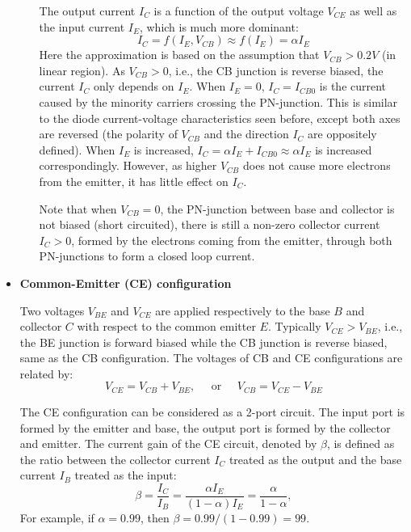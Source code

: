 \documentclass{article}
\begin{document}
\begin{itemize}
\begin{itemize}
    The output current $I_C$ is a function of the output voltage $V_{CE}$
    as well as the input current $I_E$, which is much more dominant:
    \begin{equation} 
    I_C=f(I_E,V_{CB})\approx f(I_E)=\alpha I_E
    \end{equation}
    Here the approximation is based on the assumption that $V_{CB}>0.2V$
    (in linear region). As $V_{CB}>0$, i.e., the CB junction is reverse 
    biased, the current $I_C$ only depends on $I_E$. When $I_E=0$, 
    $I_C=I_{CB0}$ is the current caused by the minority carriers crossing 
    the PN-junction. This is similar to the diode current-voltage 
    characteristics seen before, except both axes are reversed (the 
    polarity of $V_{CB}$ and the direction $I_C$ are oppositely defined).
    When $I_E$ is increased, $I_C=\alpha I_E+I_{CB0}\approx \alpha I_E$ is 
    increased correspondingly. However, as higher $V_{CB}$ does not cause
    more electrons from the emitter, it has little effect on $I_C$.

    Note that when $V_{CB}=0$, the PN-junction between base and collector
    is not biased (short circuited), there is still a non-zero collector 
    current $I_C>0$, formed by the electrons coming from the emitter,
    through both PN-junctions to form a closed loop current.
    

  \end{itemize}

\item {\bf Common-Emitter (CE) configuration}

  Two voltages $V_{BE}$ and $V_{CE}$ are applied respectively to the base 
  $B$ and collector $C$ with respect to the common emitter $E$. Typically
  $V_{CE} > V_{BE}$, i.e., the BE junction is forward biased while the CB 
  junction is reverse biased, same as the CB configuration. The voltages 
  of CB and CE configurations are related by:
  \begin{equation} 
  V_{CE}=V_{CB}+V_{BE},\;\;\;\;\;\mbox{or}\;\;\;\;\;  V_{CB}=V_{CE}-V_{BE}
  \end{equation}

    

  The CE configuration can be considered as a 2-port circuit. The input
  port is formed by the emitter and base, the output port is formed by 
  the collector and emitter. The current gain of the CE circuit, denoted 
  by $\beta$, is defined as the ratio between the collector current $I_C$ 
  treated as the output and the base current $I_B$ treated as the input:  
  \begin{equation}
  \beta=\frac{I_C}{I_B}=\frac{\alpha I_E}{(1-\alpha) I_E}=\frac{\alpha}{1-\alpha},
  \end{equation}
  For example, if $\alpha=0.99$, then $\beta=0.99/(1-0.99)=99$. 


\end{itemize}
\end{document}

